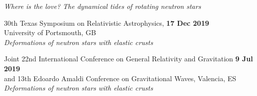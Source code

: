 \begin{etaremune}
    \textit{Where is the love? The dynamical tides of rotating neutron stars}
    \item 30th Texas Symposium on Relativistic Astrophysics,
    \hfill \textbf{17 Dec 2019} \\
    University of Portsmouth, GB \\
    \textit{Deformations of neutron stars with elastic crusts}
    \item Joint 22nd International Conference on General Relativity and Gravitation
    \hfill \textbf{9 Jul 2019} \\
    and 13th Edoardo Amaldi Conference on Gravitational Waves, Valencia, ES \\
    \textit{Deformations of neutron stars with elastic crusts}
\end{etaremune}
